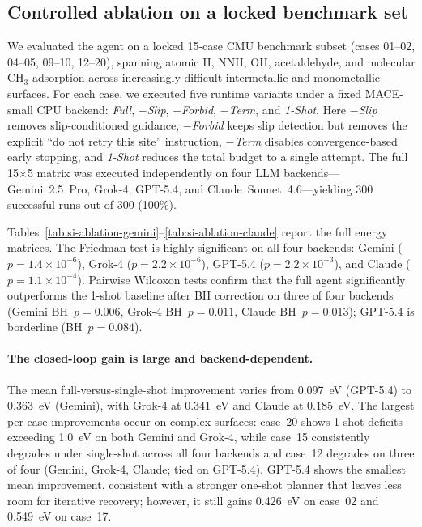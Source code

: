 \subsection{Controlled ablation on a locked benchmark set}

We evaluated the agent on a locked 15-case CMU benchmark subset (cases 01--02, 04--05, 09--10, 12--20), spanning atomic H, NNH, OH, acetaldehyde, and molecular CH$_3$ adsorption across increasingly difficult intermetallic and monometallic surfaces.
For each case, we executed five runtime variants under a fixed MACE-small CPU backend: \textit{Full}, \textit{$-$Slip}, \textit{$-$Forbid}, \textit{$-$Term}, and \textit{1-Shot}.
Here \textit{$-$Slip} removes slip-conditioned guidance, \textit{$-$Forbid} keeps slip detection but removes the explicit ``do not retry this site'' instruction, \textit{$-$Term} disables convergence-based early stopping, and \textit{1-Shot} reduces the total budget to a single attempt.
The full 15$\times$5 matrix was executed independently on four LLM backends---Gemini~2.5~Pro, Grok-4, GPT-5.4, and Claude~Sonnet~4.6---yielding 300 successful runs out of 300 (100\%).



Tables~\ref{tab:si-ablation-gemini}--\ref{tab:si-ablation-claude} report the full energy matrices.
The Friedman test is highly significant on all four backends: Gemini ($p = 1.4 \times 10^{-6}$), Grok-4 ($p = 2.2 \times 10^{-6}$), GPT-5.4 ($p = 2.2 \times 10^{-3}$), and Claude ($p = 1.1 \times 10^{-4}$).
Pairwise Wilcoxon tests confirm that the full agent significantly outperforms the 1-shot baseline after BH correction on three of four backends (Gemini BH~$p = 0.006$, Grok-4 BH~$p = 0.011$, Claude BH~$p = 0.013$); GPT-5.4 is borderline (BH~$p = 0.084$).

\paragraph{The closed-loop gain is large and backend-dependent.}
The mean full-versus-single-shot improvement varies from 0.097~eV (GPT-5.4) to 0.363~eV (Gemini), with Grok-4 at 0.341~eV and Claude at 0.185~eV.
The largest per-case improvements occur on complex surfaces: case~20 shows 1-shot deficits exceeding 1.0~eV on both Gemini and Grok-4, while case~15 consistently degrades under single-shot across all four backends and case~12 degrades on three of four (Gemini, Grok-4, Claude; tied on GPT-5.4).
GPT-5.4 shows the smallest mean improvement, consistent with a stronger one-shot planner that leaves less room for iterative recovery; however, it still gains 0.426~eV on case~02 and 0.549~eV on case~17.

